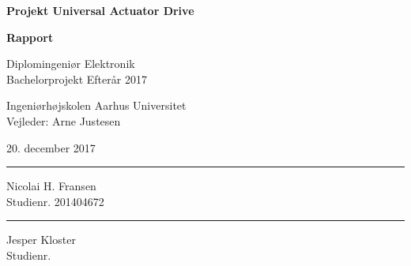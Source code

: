 \documentclass[11pt, a4paper, twoside, openany]{memoir}
\date{}
\author{\forfatter}
\title{\titel}
\begin{document}
\begin{titlingpage}
		
		\begin{center}
				{\huge\bfseries Projekt Universal Actuator Drive}\\
				\vspace{10pt}
				
				{\Huge\bfseries Rapport}\\
				
				\vspace{20pt}
				
				{Diplomingeniør Elektronik}\\
				{\large Bachelorprojekt Efterår 2017}\\
				
				\vspace{10pt}
				
				Ingeniørhøjskolen Aarhus Universitet\\
				Vejleder: Arne Justesen
				\vspace{10pt}
				
				20. december 2017
				\vspace{10pt}
				\begin{figure}[H]
					\centering
				\end{figure}
				\vspace{50pt}
				\begin{minipage}{0.25\linewidth}
					\centering
					\hrule
					\vspace{12pt}
					Nicolai H. Fransen\\
					Studienr. 201404672
				\end{minipage}
				\hspace{10pt}
				\begin{minipage}{0.25\linewidth}
					\centering
					\hrule
					\vspace{12pt}
					Jesper Kloster\\
					Studienr. 
				\end{minipage}
				\hspace{10pt}


		\end{center}

\end{titlingpage}
		
\end{document}

